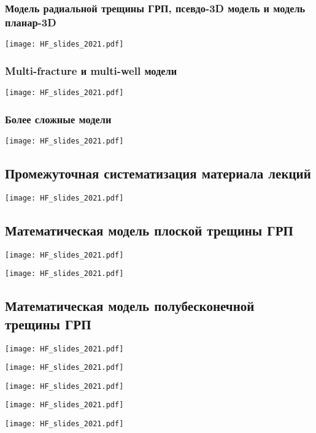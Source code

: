 \documentclass[main.tex]{subfiles}
\begin{document}
\subsubsection{Модель радиальной трещины ГРП, псевдо-3D модель и модель планар-3D}

\texttt{[image: HF\_slides\_2021.pdf]}

\subsubsection{Multi-fracture и multi-well модели}

\texttt{[image: HF\_slides\_2021.pdf]}

\subsubsection{Более сложные модели}

\texttt{[image: HF\_slides\_2021.pdf]}

\subsection{Промежуточная систематизация материала лекций}

\texttt{[image: HF\_slides\_2021.pdf]}

\subsection{Математическая модель плоской трещины ГРП}

\texttt{[image: HF\_slides\_2021.pdf]}

\texttt{[image: HF\_slides\_2021.pdf]}

\subsection{Математическая модель полубесконечной трещины ГРП}

\texttt{[image: HF\_slides\_2021.pdf]}

\texttt{[image: HF\_slides\_2021.pdf]}

\texttt{[image: HF\_slides\_2021.pdf]}

\texttt{[image: HF\_slides\_2021.pdf]}

\texttt{[image: HF\_slides\_2021.pdf]}
\end{document}
